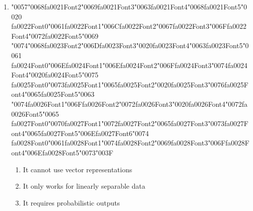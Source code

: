 \documentclass[12pt]{article}
\begin{document}
\begin{enumerate}[label=Q\arabic*.]
\begin{enumerate}[label=(\Alph*)]
    \item Laplace smoothing
    \item Regularization
    \item TF-IDF
    \item Softmax normalization
\end{enumerate}
\item {\char"0057}{\char"0068}{\csname fa0021Font2\endcsname\char"0069}{\csname fa0021Font3\endcsname\char"0063}{\csname fa0021Font4\endcsname\char"0068}{\csname fa0021Font5\endcsname\char"0020} {\csname fa0022Font0\endcsname\char"0061}{\csname fa0022Font1\endcsname\char"006C}{\csname fa0022Font2\endcsname\char"0067}{\csname fa0022Font3\endcsname\char"006F}{\csname fa0022Font4\endcsname\char"0072}{\csname fa0022Font5\endcsname\char"0069} {\char"0074}{\char"0068}{\csname fa0023Font2\endcsname\char"006D}{\csname fa0023Font3\endcsname\char"0020}{\csname fa0023Font4\endcsname\char"0063}{\csname fa0023Font5\endcsname\char"0061} {\csname fa0024Font0\endcsname\char"006E}{\csname fa0024Font1\endcsname\char"006E}{\csname fa0024Font2\endcsname\char"006F}{\csname fa0024Font3\endcsname\char"0074}{\csname fa0024Font4\endcsname\char"0020}{\csname fa0024Font5\endcsname\char"0075} {\csname fa0025Font0\endcsname\char"0073}{\csname fa0025Font1\endcsname\char"0065}{\csname fa0025Font2\endcsname\char"0020}{\csname fa0025Font3\endcsname\char"0076}{\csname fa0025Font4\endcsname\char"0065}{\csname fa0025Font5\endcsname\char"0063} {\char"0074}{\csname fa0026Font1\endcsname\char"006F}{\csname fa0026Font2\endcsname\char"0072}{\csname fa0026Font3\endcsname\char"0020}{\csname fa0026Font4\endcsname\char"0072}{\csname fa0026Font5\endcsname\char"0065} {\csname fa0027Font0\endcsname\char"0070}{\csname fa0027Font1\endcsname\char"0072}{\csname fa0027Font2\endcsname\char"0065}{\csname fa0027Font3\endcsname\char"0073}{\csname fa0027Font4\endcsname\char"0065}{\csname fa0027Font5\endcsname\char"006E}{\csname fa0027Font6\endcsname\char"0074} {\csname fa0028Font0\endcsname\char"0061}{\csname fa0028Font1\endcsname\char"0074}{\csname fa0028Font2\endcsname\char"0069}{\csname fa0028Font3\endcsname\char"006F}{\csname fa0028Font4\endcsname\char"006E}{\csname fa0028Font5\endcsname\char"0073}{\char"003F}
\begin{enumerate}[label=(\Alph*)]
    \item It cannot use vector representations
    \item It only works for linearly separable data
    \item It requires probabilistic outputs

\end{enumerate}
\end{enumerate}
\end{document}
